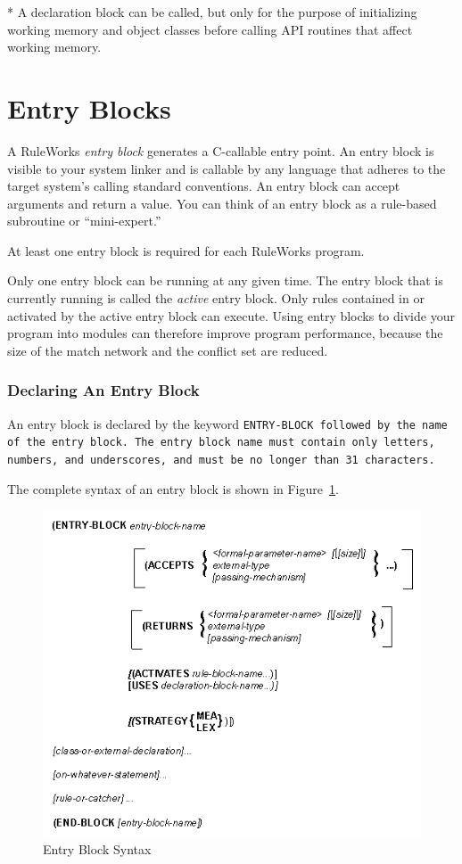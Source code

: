 * A declaration block can be called, but only for the purpose of
initializing working memory and object classes before calling API
routines that affect working memory.

\section{Entry Blocks}

A RuleWorks \emph{entry block} generates a C-callable entry point. An
entry block is visible to your system linker and is callable by any
language that adheres to the target system's calling standard
conventions. An entry block can accept arguments and return a
value. You can think of an entry block as a rule-based subroutine or
``mini-expert.''

At least one entry block is required for each RuleWorks program.

Only one entry block can be running at any given time. The entry block
that is currently running is called the \emph{active} entry
block. Only rules contained in or activated by the active entry block
can execute. Using entry blocks to divide your program into modules
can therefore improve program performance, because the size of the
match network and the conflict set are reduced.

\subsubsection{Declaring An Entry Block}

An entry block is declared by the keyword \tt{ENTRY-BLOCK} followed by
the name of the entry block. The entry block name must contain only
letters, numbers, and underscores, and must be no longer than 31
characters.

The complete syntax of an entry block is shown in Figure~\ref{f:5-1}.

\begin{figure}[h]
  \centering
  \includegraphics[scale=0.7]{f5-1}
  \caption{Entry Block Syntax}
  \label{f:5-1}
\end{figure}

